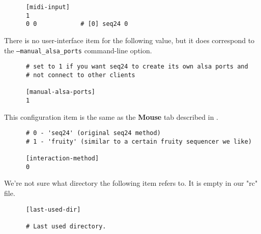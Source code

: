    \begin{verbatim}
      [midi-input]
      1
      0 0            # [0] seq24 0
   \end{verbatim}

   There is no user-interface item for the following value, but
   it does correspond to the \texttt{--manual\_alsa\_ports} command-line
   option.

   \begin{verbatim}
      # set to 1 if you want seq24 to create its own alsa ports and
      # not connect to other clients

      [manual-alsa-ports]
      1
   \end{verbatim}

   This configuration item is the same as the 
   \textbf{Mouse} tab described in
   .

   \begin{verbatim}
      # 0 - 'seq24' (original seq24 method)
      # 1 - 'fruity' (similar to a certain fruity sequencer we like)

      [interaction-method]
      0
   \end{verbatim}

   We're not sure what directory the following item refers to.
   It is empty in our "rc" file.

   \begin{verbatim}
      [last-used-dir]

      # Last used directory.
   \end{verbatim}


\iffalse
\fi

